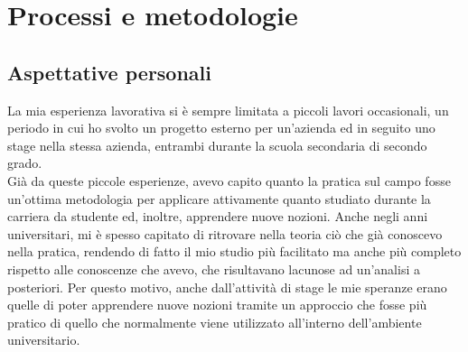 
\chapter{Processi e metodologie}
\label{cap:processi-metodologie}

\section{Aspettative personali}
La mia esperienza lavorativa si è sempre limitata a piccoli lavori occasionali, un periodo in cui ho svolto un progetto esterno per un'azienda ed in seguito uno stage nella stessa azienda, entrambi durante la scuola secondaria di secondo grado.\\
Già da queste piccole esperienze, avevo capito quanto la pratica sul campo fosse un'ottima metodologia per applicare attivamente quanto studiato durante la carriera da studente ed, inoltre, apprendere nuove nozioni. Anche negli anni universitari, mi è spesso capitato di ritrovare nella teoria ciò che già conoscevo nella pratica, rendendo di fatto il mio studio più facilitato ma anche più completo rispetto alle conoscenze che avevo, che risultavano lacunose ad un'analisi a posteriori. Per questo motivo, anche dall'attività di stage le mie speranze erano quelle di poter apprendere nuove nozioni tramite un approccio che fosse più pratico di quello che normalmente viene utilizzato all'interno dell'ambiente universitario.
 
